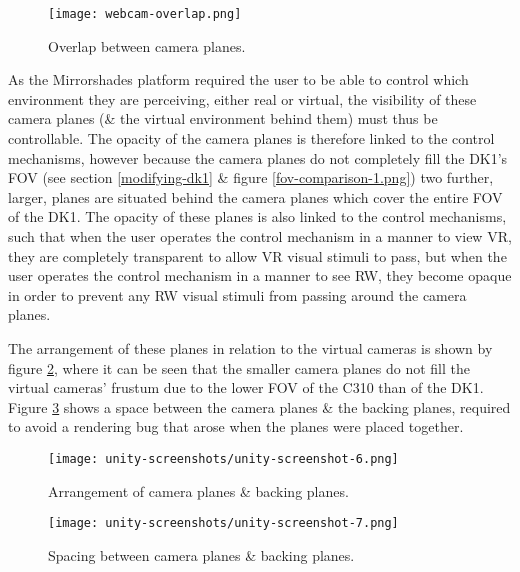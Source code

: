 \begin{figure}[h]
	\begin{center}
		\texttt{[image: webcam-overlap.png]}
		\caption{Overlap between camera planes.}
		\label{webcam-overlap.png}
	\end{center}
\end{figure}

As the Mirrorshades platform required the user to be able to control which environment they are perceiving, either real or virtual, the visibility of these camera planes (\& the virtual environment behind them) must thus be controllable. The opacity of the camera planes is therefore linked to the control mechanisms, however because the camera planes do not completely fill the DK1's FOV (see section \ref{modifying-dk1} \& figure \ref{fov-comparison-1.png}) two further, larger, planes are situated behind the camera planes which cover the entire FOV of the DK1. The opacity of these planes is also linked to the control mechanisms, such that when the user operates the control mechanism in a manner to view VR, they are completely transparent to allow VR visual stimuli to pass, but when the user operates the control mechanism in a manner to see RW, they become opaque in order to prevent any RW visual stimuli from passing around the camera planes.

The arrangement of these planes in relation to the virtual cameras is shown by figure \ref{unity-screenshot-6.png}, where it can be seen that the smaller camera planes do not fill the virtual cameras' frustum due to the lower FOV of the C310 than of the DK1. Figure \ref{unity-screenshot-7.png} shows a space between the camera planes \& the backing planes, required to avoid a rendering bug that arose when the planes were placed together.

\begin{figure}[h]
	\begin{center}
		\texttt{[image: unity-screenshots/unity-screenshot-6.png]}
		\caption{Arrangement of camera planes \& backing planes.}
		\label{unity-screenshot-6.png}
	\end{center}
\end{figure}

\begin{figure}[h]
	\begin{center}
		\texttt{[image: unity-screenshots/unity-screenshot-7.png]}
		\caption{Spacing between camera planes \& backing planes.}
		\label{unity-screenshot-7.png}
	\end{center}
\end{figure}

